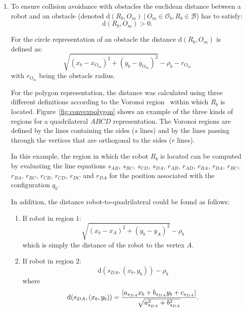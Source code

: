 \documentclass[eprint]{actapoly}
\begin{document}
\begin{enumerate}
    
    \item 
    To ensure collision avoidance with obstacles the euclidean 
    distance between
    a robot and an obstacle (denoted $\mathrm{d}(R_b, O_m)\ |\ O_m
    \in \mathcal{O}_b, R_b \in \mathcal{B} $) has to satisfy:
    \begin{equation}
    	\mathrm{d}(R_b, O_m) > 0.
    \end{equation}
    
    For the circle representation of an obstacle the distance
    $\mathrm{d}(R_b, O_m)$ is defined as:
    \begin{equation*}
        \sqrt{(x_{b} - x_{O_m})^2 + (y_{b} - y_{\mathrm{O}_m})^2}  - \rho_b - r_{O_m}
    \end{equation*}
    with $r_{O_m}$ being the obstacle radius.
    
    For the polygon representation, the distance was calculated using three different
    definitions according to the Voronoi region~\cite{ericson2004real}
    within which
    $R_b$ is located. Figure~\ref{fig:convexpolygon} shows an example of the three kinds
    of regions for a quadrilateral $ABCD$ representation. The Voronoi regions are 
    defined by
    the lines containing the sides ($s$ lines) and by the lines passing
    through the vertices that are orthogonal to the sides ($r$ lines).    
    
	In this example, the region in which the robot $R_b$ is located
	can be computed by evaluating the line
 	equations 
 	$s_{AB}$, $s_{BC}$, $s_{CD}$, $s_{DA}$, $r_{AB}$, $r_{AD}$, $r_{BA}$, $r_{BA}$,
 	$r_{BC}$, $r_{BA}$, $r_{BC}$, $r_{CB}$, $r_{CD}$, $r_{DC}$ and $r_{DA}$ for 
 	the position associated with the configuration $q_b$.
 	
    
    In addition, the distance
    robot-to-quadrilateral could be found as follows:
    \begin{enumerate}
    
	   	\item If robot in region $1$:
   	   	\begin{equation*}
    	    \sqrt{(x_{b} - x_{A})^2 + (y_{b} - y_{A})^2} - \rho_b
	    \end{equation*}
	    which is simply the distance of the robot to the vertex $A$.
	    
	    \item If robot in region $2$:
%	    
		\begin{equation*}
			\mathrm{d}(s_{DA}, (x_{b}, y_{b})) - \rho_b
		\end{equation*}
		where
   	   	\begin{equation*}
    	    \mathrm{d}(s_{DA}, (x_{b}, y_{b})) =\\ \frac{|a_{s_{DA}}x_{b} + b_{s_{DA}}y_{b}
    	    + c_{s_{DA}}|}{\sqrt{a_{s_{DA}}^2 + b_{s_{DA}}^2}}.
	    \end{equation*}
	    

\end{enumerate}
\end{enumerate}
\end{document}
